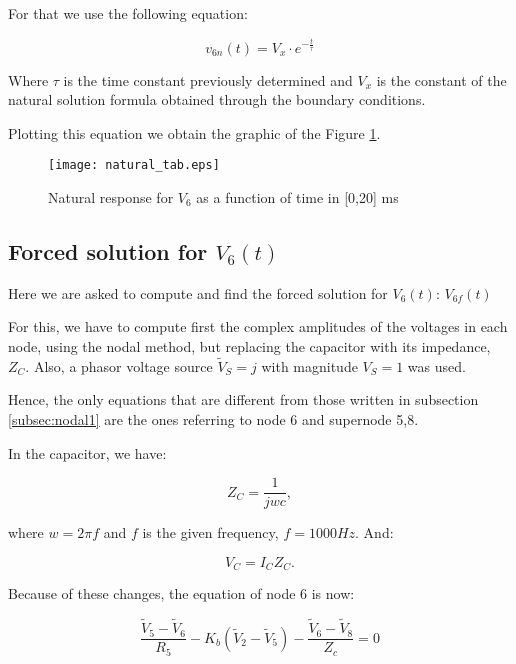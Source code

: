 For that we use the following equation:

\begin{equation}
    v_{6n}(t) = V_{x}\cdot e^{-\frac{t}{\tau}}
\end{equation}

Where $\tau$ is the time constant previously determined and $V_x$ is the constant of the natural solution formula obtained through the boundary conditions.

Plotting this equation we obtain the graphic of the Figure \ref{fig:naturalresponse}.

\begin{figure}[H] \centering
  \texttt{[image: natural\_tab.eps]}
  \caption{Natural response for $V_6$ as a function of time in [0,20] ms}
  \label{fig:naturalresponse}
\end{figure} 

\subsection{Forced solution for $V_{6}(t)$}
\par
Here we are asked to compute and find the forced solution for $V_{6}(t)$: $V_{6f}(t)$

For this, we have to compute first the complex amplitudes of the voltages in each node, using the nodal method, but replacing the capacitor with its impedance, $Z_C$. Also, a phasor voltage source $\tilde{V}_S = j$ with magnitude $V_S = 1$ was used.

Hence, the only equations that are different from those written in subsection \ref{subsec:nodal1} are the ones referring to node 6 and supernode 5,8. 

In the capacitor, we have:

\begin{equation}
    Z_C = \frac{1}{jwc},
\end{equation}

where $w = 2 \pi f$ and $f$ is the given frequency, $f = 1000Hz$. And: 

\begin{equation}
    V_C = I_C Z_C.
\end{equation}

Because of these changes, the equation of node 6 is now:

\begin{equation}
   \frac{\tilde{V}_5 - \tilde{V}_6}{R_5} - K_b(\tilde{V}_2 - \tilde{V}_5) - \frac{\tilde{V}_6 - \tilde{V}_8}{Z_c} = 0
\end{equation}

